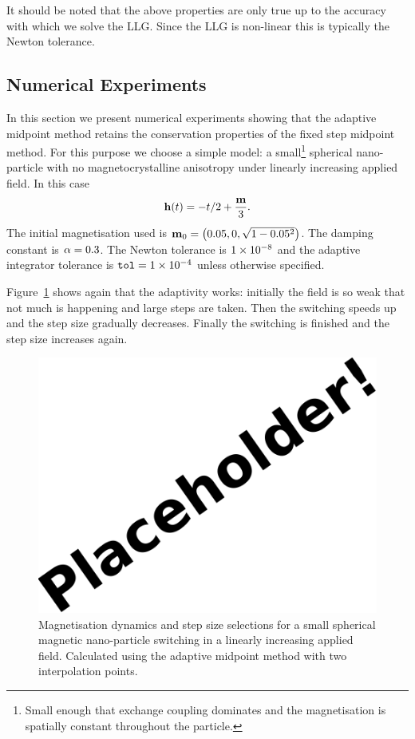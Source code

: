 It should be noted that the above properties are only true up to the accuracy with which we solve the LLG. Since the LLG is non-linear this is typically the Newton tolerance.


\subsection{Numerical Experiments}

In this section we present numerical experiments showing that the adaptive midpoint method retains the conservation properties of the fixed step midpoint method.
For this purpose we choose a simple model: a small\footnote{Small enough that exchange coupling dominates and the magnetisation is spatially constant throughout the particle.} spherical nano-particle with no magnetocrystalline anisotropy under linearly increasing applied field.
In this case
\begin{equation}
  \mathbf{h}(t) = - t/2 +  \frac{\mathbf{m}}{3}.
\end{equation}
The initial magnetisation used is $\mathbf{m}_0 = \left( 0.05, 0, \sqrt{1 - 0.05^2} \right)$.
The damping constant is $\alpha = 0.3$.
The Newton tolerance is $1\times 10^{-8}$ and the adaptive integrator tolerance is ${\textrm{\textup{\texttt{tol}}}} = 1\times 10^{-4}$ unless otherwise specified.

Figure~\ref{fig:linear-field-switch-mp} shows again that the adaptivity works: initially the field is so weak that not much is happening and large steps are taken.
Then the switching speeds up and the step size gradually decreases.
Finally the switching is finished and the step size increases again.

\begin{figure}[ht!]
  \centering
  \includegraphics{images/placeholder}
  \caption{Magnetisation dynamics and step size selections for a small spherical magnetic nano-particle switching in a linearly increasing applied field. Calculated using the adaptive midpoint method with two interpolation points.}
  \label{fig:linear-field-switch-mp}
\end{figure}

